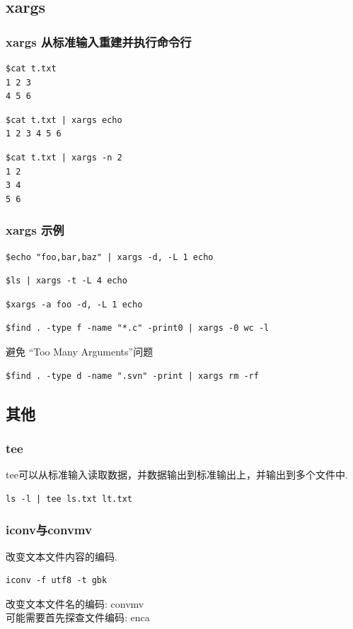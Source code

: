 \documentclass[compress]{beamer}
\begin{document}
\subsection{xargs}

\begin{frame}[fragile]
    \frametitle{xargs 从标准输入重建并执行命令行}
\begin{Verbatim}
$cat t.txt 
1 2 3 
4 5 6
\end{Verbatim}
\begin{Verbatim}
$cat t.txt | xargs echo
1 2 3 4 5 6
\end{Verbatim}
\begin{Verbatim}
$cat t.txt | xargs -n 2 
1 2 
3 4 
5 6
\end{Verbatim}
\end{frame}

\begin{frame}[fragile]
    \frametitle{xargs 示例}
\begin{Verbatim}
$echo "foo,bar,baz" | xargs -d, -L 1 echo
\end{Verbatim}
\pause
\begin{Verbatim}
$ls | xargs -t -L 4 echo
\end{Verbatim}
\pause
\begin{Verbatim}
$xargs -a foo -d, -L 1 echo
\end{Verbatim}
\pause
\begin{Verbatim}
$find . -type f -name "*.c" -print0 | xargs -0 wc -l
\end{Verbatim}
\pause
\noindent 避免 ``Too Many Arguments''问题
\begin{Verbatim}
$find . -type d -name ".svn" -print | xargs rm -rf
\end{Verbatim}
\end{frame}

\subsection{其他}

\begin{frame}[fragile]
	\frametitle{tee}
tee可以从标准输入读取数据，并数据输出到标准输出上，并输出到多个文件中.

\begin{Verbatim}
ls -l | tee ls.txt lt.txt
\end{Verbatim}
\end{frame}

\begin{frame}[fragile]
	\frametitle{iconv与convmv}
改变文本文件内容的编码.

\begin{Verbatim}
iconv -f utf8 -t gbk
\end{Verbatim}

改变文本文件名的编码: convmv \\

可能需要首先探查文件编码: enca

\end{frame}
\end{document}
